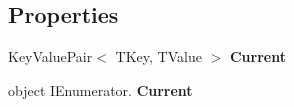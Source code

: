 \subsection*{Properties}
\begin{DoxyCompactItemize}
\item 
Key\+Value\+Pair$<$ T\+Key, T\+Value $>$ {\bfseries Current}\hypertarget{struct_serializable_dictionary_1_1_enumerator_a78aeed879a6b918330f09cb3398d3af0}{}\label{struct_serializable_dictionary_1_1_enumerator_a78aeed879a6b918330f09cb3398d3af0}

\item 
object I\+Enumerator. {\bfseries Current}\hypertarget{struct_serializable_dictionary_1_1_enumerator_ac2fec577fac56fb49ccad158170b9d3d}{}\label{struct_serializable_dictionary_1_1_enumerator_ac2fec577fac56fb49ccad158170b9d3d}

\end{DoxyCompactItemize}
